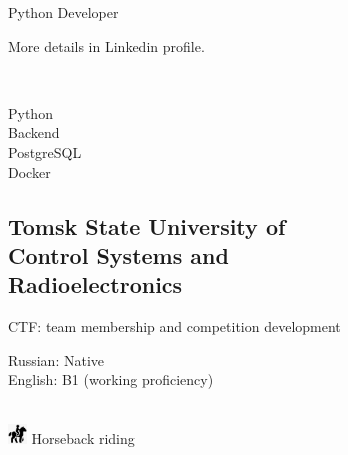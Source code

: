 \documentclass[a4paper]{MagicalCV}
\begin{document}
\lastupdated


\begin{minipage}[t]{0.33\textwidth} 


Python Developer

More details in Linkedin profile.
\sectionsep


\\


\sectionsep


\textbullet{}Python \\
\textbullet{}Backend \\
\textbullet{}PostgreSQL \\
\textbullet{}Docker \\


\subsection{Tomsk State University of \\ Control Systems and \\ Radioelectronics}
\vspace{\topsep} %
CTF: team membership and competition development
\sectionsep


Russian: Native\\
English: B1 (working proficiency)
\sectionsep

\\
\includegraphics[width=0.5cm]{horse_icon.png} Horseback riding
\sectionsep


\end{minipage} 
\end{document}
